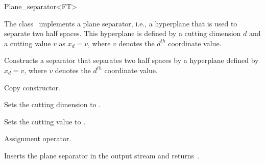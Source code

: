

\begin{ccRefClass}{Plane_separator<FT>}  %


\begin{ccAdvanced}

\ccDefinition
  
The class \ccRefName\ implements a plane separator, i.e., a hyperplane that is used to separate two half spaces.
This hyperplane is defined by a cutting dimension $d$ and a cutting value $v$
as $x_d=v$, where $v$ denotes the $d^{th}$ coordinate value.


\ccIsModel


\ccCreation
{}  %



{Constructs a separator that separates two half spaces by a hyperplane
defined by $x_d=v$, where $v$ denotes the $d^{th}$ coordinate value.}

{Copy constructor.}

\ccOperations

{Sets the cutting dimension to . }

{Sets the cutting value to . }




{Assignment operator.}


{Inserts the plane separator  in the output stream  and returns~.}

\end{ccAdvanced}

\end{ccRefClass}


